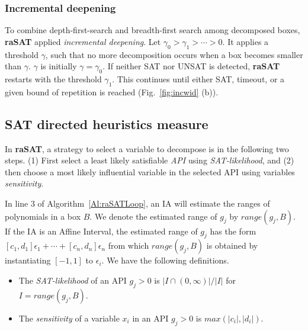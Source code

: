 \documentclass[runningheads,a4paper,oribibl]{llncs}
\newcommand{\suppress}[1]{} %
\begin{document}
\subsubsection*{Incremental deepening}

To combine depth-first-search and breadth-first search among decomposed boxes,
{\bf raSAT} applied {\em incremental deepening}. 
Let $\gamma_0 > \gamma_1 > \cdots > 0$. 
It applies a threshold $\gamma$, such that no more decomposition occurs 
when a box becomes smaller than $\gamma$.
$\gamma$ is initially $\gamma=\gamma_0$. 
If neither SAT nor UNSAT is detected, {\bf raSAT} restarts with the threshold $\gamma_1$.
This continues until either SAT, timeout, or
a given bound of repetition is reached (Fig.~\ref{fig:incwid} (b)). 

\subsection{SAT directed heuristics measure} \label{sec:SATheuristics}

\suppress{
With several hundred variables, we observe that an SMT solver works
when either SAT, or UNSAT with small UNSAT core.
%
For the latter, we need an efficient heuristics to find an UNSAT core, which is left as future work. 
For the former, the keys are how to choose variables to decompose, and 
how to choose a box to explore.
}%

In {\bf raSAT}, a strategy to select a variable to decompose is in the following two steps. 
(1) First select a least likely satisfiable {\em API} using {\em SAT-likelihood}, and
(2) then choose a most likely influential variable in the selected API using variables {\em sensitivity}.

\sloppy

In line 3 of Algorithm~\ref{Al:raSATLoop}, an IA will estimate the ranges of polynomials in a box $B$.
We denote the estimated range of $g_j$ by $range(g_j, B)$. 
If the IA is an Affine Interval, the estimated range of $g_j$ has the form
${[c_1,d_1]\epsilon_1 + \cdots + [c_n,d_n]\epsilon_n}$ from which $range(g_j, B)$ is obtained
by instantiating $[-1,1]$ to $\epsilon_i$. 
We have the following definitions. 
\begin{itemize} 
\item The {\em SAT-likelihood} of an API $g_j > 0$ is $| I \cap (0,\infty) | / |I|$
  for  $I = range(g_j, B)$. 
\item The {\em sensitivity} of a variable $x_i$ in an API $g_j > 0$ is $max(|c_i|, |d_i|)$. 
\end{itemize} 
\end{document}
